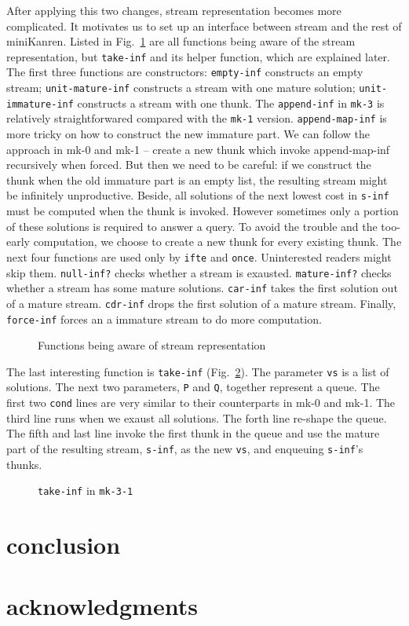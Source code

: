 \documentclass[format=acmlarge, review=true, authordraft=true]{acmart}
\begin{document}
After applying this two changes, stream representation becomes more 
complicated. It motivates us to set up an interface between stream 
and the rest of miniKanren. Listed in Fig.~\ref{interface} are all functions 
being aware of the stream representation, but \texttt{take-inf} and its helper 
function, which are explained later. The first three functions are 
constructors: 
\texttt{empty-inf} constructs an empty stream; \texttt{unit-mature-inf} 
constructs a stream with one mature solution; \texttt{unit-immature-inf} 
constructs a stream with one thunk. The \texttt{append-inf} in \texttt{mk-3} is 
relatively straightforwared compared with the \texttt{mk-1} version. 
\texttt{append-map-inf} is more tricky on how to construct the new immature 
part. We can follow the approach in mk-0 and mk-1 -- create a new thunk which 
invoke append-map-inf recursively when forced. But then we need to be careful: 
if we construct the thunk when the old immature part is an empty list, the 
resulting stream might be infinitely unproductive. Beside, all solutions of the 
next lowest cost in \texttt{s-inf} must be computed when the thunk is invoked. 
However sometimes only a portion of these solutions is required to answer a 
query. To avoid the trouble and the too-early computation, we choose to create 
a new thunk for every existing thunk. The next four functions are used only by 
\texttt{ifte} and \texttt{once}. Uninterested readers might skip them. 
\texttt{null-inf?} checks whether a stream is exausted. \texttt{mature-inf?} 
checks whether a stream has some mature solutions. \texttt{car-inf} takes the 
first solution out of a mature stream. \texttt{cdr-inf} drops the first 
solution of a mature stream. Finally, \texttt{force-inf} forces an a immature 
stream to do more computation.

\begin{figure}
	 	
	 \caption{Functions being aware of stream representation}
	 \label{interface}
\end{figure}

The last interesting function is \texttt{take-inf} (Fig.~\ref{take-inf-3-1}). 
The parameter \texttt{vs} is a list of solutions. The next two parameters, 
\texttt{P} and \texttt{Q}, together represent a queue. The first two 
\texttt{cond} lines are very similar to their counterparts in mk-0 and mk-1. 
The third line runs when we exaust all solutions. The forth line re-shape the 
queue. The fifth and last line invoke the first thunk in the queue and use the 
mature part of the resulting stream, \texttt{s-inf}, as the new \texttt{vs}, 
and enqueuing \texttt{s-inf}'s thunks. 

\begin{figure}
	 	
	 \caption{\texttt{take-inf} in \texttt{mk-3-1}}
	 \label{take-inf-3-1}
\end{figure}



\section{conclusion}

\section*{acknowledgments}



\end{document}
